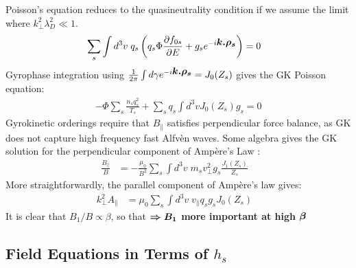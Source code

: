 \documentclass[10pt,a4paper]{article}
\newcommand{\pd}[2]{\frac{\partial{#1}}{\partial{#2}} }
\newcommand{\bfm}[1]{\mbox{{\boldmath $ { #1}$}}}
\begin{document}
Poisson's equation reduces to the quasineutrality condition if we assume the
limit where $k_{\perp}^2 \lambda_D^2 \ll 1$.
\begin{align*}
& \sum_s \int d^3v \; q_s \left( q_s \Phi \pd{f_{0s}}{E} + g_s
  e^{-i\bfm{k.\rho_s}} \right)  = 0
\end{align*}
Gyrophase integration using $\frac{1}{ 2\pi} \int d\gamma e^{-i
  \bfm{k.\rho_s}} = J_0(Z_s)$ gives the GK Poisson equation:
\begin{align}
- \Phi \sum_s \frac{n_s q_s^2}{T_s}  +  \sum_s q_s \int d^3v J_0(Z_s) g_s  =
0 \label{eq:poisson}
\end{align}
Gyrokinetic orderings require that $B_{\parallel}$ satisfies perpendicular
force balance, as GK does not capture high frequency fast Alfv\`{e}n
waves. Some algebra gives the GK solution for the perpendicular component of
Amp\`{e}re's Law :
\begin{align}
\frac{B_{\parallel}}{B} & = -\frac{\mu_0}{B^2} \sum_s \int d^3v \; m_s
v_{\perp}^2 g_s \frac{J_1(Z_s)}{Z_s} & \label{eq:bpar}
\end{align}
More straightforwardly, the parallel component of Amp\`ere's law gives:
\begin{align}
k_{\perp}^2 A_{\parallel} & = \mu_0 \sum_s \int d^3v \; v_{\parallel} q_s g_s
J_0(Z_s) & \label{eq:apar}
\end{align}
It is clear that $B_1/B \propto \beta$, so that \textbf{$\bfm{\Rightarrow
    B_1}$ more important at high $\bfm{\beta}$}

\subsection{\label{GS2} Field Equations in Terms of $h_s$}
\end{document}
